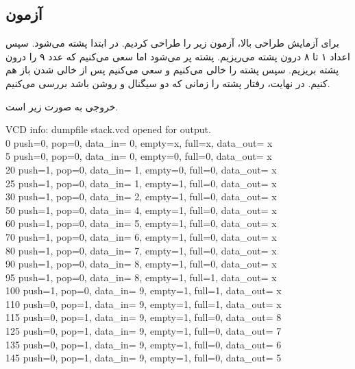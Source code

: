 \documentclass{perassignments}
\begin{document}
	\subsection{آزمون}
	برای آزمایش طراحی بالا، آزمون زیر را طراحی کردیم. در ابتدا پشته 
	می‌شود. سپس اعداد ۱ تا ۸ درون پشته می‌ریزیم. پشته پر می‌شود اما سعی می‌کنیم که عدد ۹ را درون پشته بریزیم. سپس پشته را خالی می‌کنیم و سعی می‌کنیم پس از خالی شدن باز هم 
	کنیم. در نهایت، رفتار پشته را زمانی که دو سیگنال 
	و 
	روشن باشد بررسی می‌کنیم.
	\begin{latin}
		\raggedleft
		
	\end{latin}
	خروجی به صورت زیر است.
	\begin{latin}
\ttfamily
VCD info: dumpfile stack.vcd opened for output.\\
0    push=0, pop=0, data\_in= 0, empty=x, full=x, data\_out= x\\
5    push=0, pop=0, data\_in= 0, empty=0, full=0, data\_out= x\\
20    push=1, pop=0, data\_in= 1, empty=0, full=0, data\_out= x\\
25    push=1, pop=0, data\_in= 1, empty=1, full=0, data\_out= x\\
30    push=1, pop=0, data\_in= 2, empty=1, full=0, data\_out= x\\
50    push=1, pop=0, data\_in= 4, empty=1, full=0, data\_out= x\\
60    push=1, pop=0, data\_in= 5, empty=1, full=0, data\_out= x\\
70    push=1, pop=0, data\_in= 6, empty=1, full=0, data\_out= x\\
80    push=1, pop=0, data\_in= 7, empty=1, full=0, data\_out= x\\
90    push=1, pop=0, data\_in= 8, empty=1, full=0, data\_out= x\\
95    push=1, pop=0, data\_in= 8, empty=1, full=1, data\_out= x\\
100    push=1, pop=0, data\_in= 9, empty=1, full=1, data\_out= x\\
110    push=0, pop=1, data\_in= 9, empty=1, full=1, data\_out= x\\
115    push=0, pop=1, data\_in= 9, empty=1, full=0, data\_out= 8\\
125    push=0, pop=1, data\_in= 9, empty=1, full=0, data\_out= 7\\
135    push=0, pop=1, data\_in= 9, empty=1, full=0, data\_out= 6\\
145    push=0, pop=1, data\_in= 9, empty=1, full=0, data\_out= 5\\

\end{latin}
\end{document}
